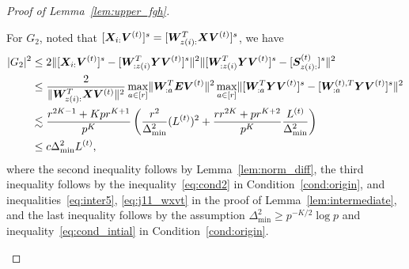 \documentclass[lettersize,onecolumn,journal]{IEEEtran}
\theoremstyle{definition}
\theoremstyle{definition}
\newcommand{\of}[1]{\left(#1\right)}
\begin{document}
\begin{proof}[Proof of Lemma~\ref{lem:upper_fgh}]
\begin{enumerate}
    For $G_2$, noted that $[\bm X_{i:} \bm{V}^{(t)}]^s = [ \bm{W}_{z(i):}^T\bm X \bm{V}^{(t)}]^s$, we have 
    \begin{align}
        |G_2|^2 &\leq 2\onormSize{}{ [\mX_{i:} \mV^{(t)}]^s  -  [  \mW_{:z(i)}^T \mY \mV^{(t)} ]^s}^2 \onormSize{}{ [  \mW_{:z(i)}^T \mY \mV^{(t)} ]^s -  [  \mS_{z(i):}^{(t)}  ]^s }^2 \\
        & \leq \frac{2}{ \onormSize{}{ \mW_{z(i):}^T\mX \mV^{(t)}}^2} \max_{a \in [r]}\onormSize{}{ \mW_{:a}^T \mE \mV^{(t)} }^2 \max_{a \in [r]} \onormSize{}{ [  \mW_{:a}^T \mY \mV^{(t)} ]^s -  [   \mW_{:a}^{(t),T} \mY \mV^{(t)}  ]^s}^2\\
        & \lesssim \frac{ r^{2K-1} + K p r^{K+1} }{p^{K}} \of{ \frac{r^2}{\Delta_{\min}^2} (L^{(t)})^2 + \frac{r r^{2K} + pr^{K+2}}{p^{K}} \frac{L^{(t)}}{\Delta_{\min}^2} }\\
        & \leq c \Delta_{\min}^2 L^{(t)},\label{eq:g2}
    \end{align}
    where the second inequality follows by Lemma~\ref{lem:norm_diff}, the third inequality follows by the inequality~\eqref{eq:cond2} in Condition~\ref{cond:origin}, and inequalities~\eqref{eq:inter5}, \eqref{eq:j11_wxvt} in the proof of Lemma~\ref{lem:intermediate},  and the last inequality follows by the assumption $\Delta_{\min}^2 \geq p^{-K/2} \log p$ and inequality~\eqref{eq:cond_intial} in Condition~\ref{cond:origin}.
    

\end{enumerate}
\end{proof}
\end{document}
